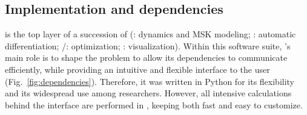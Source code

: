 \subsection{Implementation and dependencies}
\bioptim is the top layer of a succession of  (\biorbd: dynamics and MSK modeling; \casadi: automatic differentiation; \ipopt/\acados: optimization; \bioviz: visualization).
Within this software suite, \bioptim 's main role is to shape the problem to allow its dependencies to communicate efficiently, while providing an intuitive and flexible interface to the user (Fig.~\ref{fig:dependencies}).
Therefore, it was written in Python for its flexibility and its widespread use among researchers.
However, all intensive calculations behind the interface are performed in , keeping \bioptim both fast and easy to customize.

